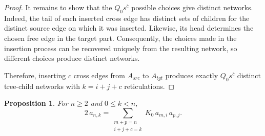 \documentclass[11pt]{article}
\newtheorem{proposition}[theorem]{Proposition}
\theoremstyle{definition}
\theoremstyle{remark}
\newcommand{\rise}[2]{#1^{\overline{#2}}}
\begin{document}
\begin{proof}
It remains to show that the $Q_0\rise{s}{c}$ possible choices give distinct
networks. 
Indeed, the tail of each
inserted cross edge has distinct sets of children for the distinct source edge on which it
was inserted. 
%
Likewise, its head determines the chosen free edge in
the target part. Consequently, the choices made in the insertion
process can be recovered uniquely from the resulting network, so
different choices produce distinct networks.

Therefore, inserting $c$ cross edges from $A_{src}$ to $A_{tgt}$ produces exactly $Q_0\rise{s}{c}$
distinct tree-child networks with $k=i+j+c$ reticulations.
\end{proof}

\begin{proposition} \label{prop:split}
For $n\ge2$ and $0\le k<n$,
\begin{equation}\label{eq:formB}
  2\,a_{n, k}=\sum_{\substack{m+p=n\\ i+j+c=k}} K_0\,a_{m, i}\,a_{p, j}.
\end{equation}
\end{proposition}
\end{document}
